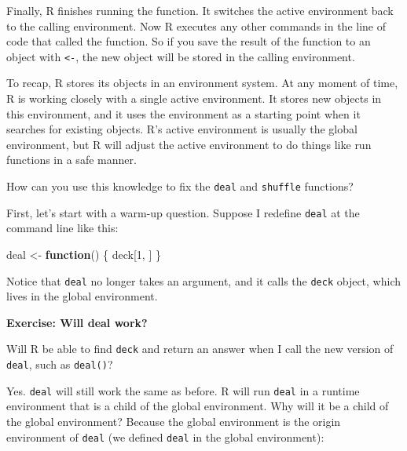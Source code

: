 \documentclass[
  letterpaper,
  DIV=11,
  numbers=noendperiod]{scrbook}
\newenvironment{Shaded}{\begin{snugshade}}{\end{snugshade}}
\newcommand{\ControlFlowTok}[1]{\textcolor[rgb]{0.00,0.23,0.31}{\textbf{#1}}}
\newcommand{\DecValTok}[1]{\textcolor[rgb]{0.68,0.00,0.00}{#1}}
\newcommand{\NormalTok}[1]{\textcolor[rgb]{0.00,0.23,0.31}{#1}}
\newcommand{\OtherTok}[1]{\textcolor[rgb]{0.00,0.23,0.31}{#1}}
\begin{document}
Finally, R finishes running the function. It switches the active
environment back to the calling environment. Now R executes any other
commands in the line of code that called the function. So if you save
the result of the function to an object with \texttt{\textless{}-}, the
new object will be stored in the calling environment.

To recap, R stores its objects in an environment system. At any moment
of time, R is working closely with a single active environment. It
stores new objects in this environment, and it uses the environment as a
starting point when it searches for existing objects. R's active
environment is usually the global environment, but R will adjust the
active environment to do things like run functions in a safe manner.

How can you use this knowledge to fix the \texttt{deal} and
\texttt{shuffle} functions?

First, let's start with a warm-up question. Suppose I redefine
\texttt{deal} at the command line like this:

\begin{Shaded}
\begin{Highlighting}[]
\NormalTok{deal }\OtherTok{\textless{}{-}} \ControlFlowTok{function}\NormalTok{() \{}
\NormalTok{  deck[}\DecValTok{1}\NormalTok{, ]}
\NormalTok{\}}
\end{Highlighting}
\end{Shaded}

Notice that \texttt{deal} no longer takes an argument, and it calls the
\texttt{deck} object, which lives in the global environment.

\begin{tcolorbox}[enhanced jigsaw, left=2mm, breakable, colback=white, colframe=quarto-callout-color-frame, leftrule=.75mm, bottomrule=.15mm, arc=.35mm, opacityback=0, rightrule=.15mm, toprule=.15mm]

\vspace{-3mm}\textbf{Exercise: Will deal work?}\vspace{3mm}

Will R be able to find \texttt{deck} and return an answer when I call
the new version of \texttt{deal}, such as \texttt{deal()}?

\end{tcolorbox}

Yes. \texttt{deal} will still work the same as before. R will run
\texttt{deal} in a runtime environment that is a child of the global
environment. Why will it be a child of the global environment? Because
the global environment is the origin environment of \texttt{deal} (we
defined \texttt{deal} in the global environment):
\end{document}
